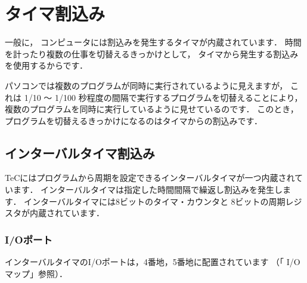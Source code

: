 \newpage
\section{タイマ割込み}

一般に，
コンピュータには割込みを発生するタイマが内蔵されています．
時間を計ったり複数の仕事を切替えるきっかけとして，
タイマから発生する割込みを使用するからです．

パソコンでは複数のプログラムが同時に実行されているように見えますが，
これは 1/10 〜 1/100 秒程度の間隔で実行するプログラムを切替えることにより，
複数のプログラムを同時に実行しているように見せているのです．
このとき，プログラムを切替えるきっかけになるのはタイマからの割込みです．

\subsection{インターバルタイマ割込み}

TeCにはプログラムから周期を設定できるインターバルタイマが一つ内蔵されています．
インターバルタイマは指定した時間間隔で繰返し割込みを発生します．
インターバルタイマには8ビットのタイマ・カウンタと
8ビットの周期レジスタが内蔵されています．

\subsubsection{I/Oポート}
インターバルタイマのI/Oポートは，4番地，5番地に配置されています
（「 I/Oマップ」参照）．

